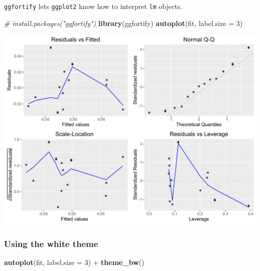 \documentclass[]{article}
\newenvironment{Shaded}{\begin{snugshade}}{\end{snugshade}}
\newcommand{\KeywordTok}[1]{\textcolor[rgb]{0.13,0.29,0.53}{\textbf{{#1}}}}
\newcommand{\DataTypeTok}[1]{\textcolor[rgb]{0.13,0.29,0.53}{{#1}}}
\newcommand{\DecValTok}[1]{\textcolor[rgb]{0.00,0.00,0.81}{{#1}}}
\newcommand{\StringTok}[1]{\textcolor[rgb]{0.31,0.60,0.02}{{#1}}}
\newcommand{\CommentTok}[1]{\textcolor[rgb]{0.56,0.35,0.01}{\textit{{#1}}}}
\newcommand{\NormalTok}[1]{{#1}}
\begin{document}
\texttt{ggfortify} lets \texttt{ggplot2} know how to interpret
\texttt{lm} objects.

\begin{Shaded}
\begin{Highlighting}[]
\CommentTok{# install.packages("ggfortify")}
\KeywordTok{library}\NormalTok{(ggfortify)}
\KeywordTok{autoplot}\NormalTok{(fit, }\DataTypeTok{label.size =} \DecValTok{3}\NormalTok{)}
\end{Highlighting}
\end{Shaded}

\begin{center}\includegraphics{0_all_posts_pdf/lr_18-1} \end{center}

\subsubsection{Using the white theme}\label{using-the-white-theme-11}

\begin{Shaded}
\begin{Highlighting}[]
\KeywordTok{autoplot}\NormalTok{(fit, }\DataTypeTok{label.size =} \DecValTok{3}\NormalTok{) +}\StringTok{ }\KeywordTok{theme_bw}\NormalTok{()}
\end{Highlighting}
\end{Shaded}
\end{document}
